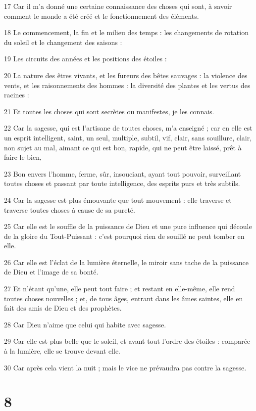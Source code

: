 \par 17 Car il m'a donné une certaine connaissance des choses qui sont, à savoir comment le monde a été créé et le fonctionnement des éléments.
\par 18 Le commencement, la fin et le milieu des temps : les changements de rotation du soleil et le changement des saisons :
\par 19 Les circuits des années et les positions des étoiles :
\par 20 La nature des êtres vivants, et les fureurs des bêtes sauvages : la violence des vents, et les raisonnements des hommes : la diversité des plantes et les vertus des racines :
\par 21 Et toutes les choses qui sont secrètes ou manifestes, je les connais.
\par 22 Car la sagesse, qui est l'artisane de toutes choses, m'a enseigné ; car en elle est un esprit intelligent, saint, un seul, multiple, subtil, vif, clair, sans souillure, clair, non sujet au mal, aimant ce qui est bon, rapide, qui ne peut être laissé, prêt à faire le bien,
\par 23 Bon envers l'homme, ferme, sûr, insouciant, ayant tout pouvoir, surveillant toutes choses et passant par toute intelligence, des esprits purs et très subtils.
\par 24 Car la sagesse est plus émouvante que tout mouvement : elle traverse et traverse toutes choses à cause de sa pureté.
\par 25 Car elle est le souffle de la puissance de Dieu et une pure influence qui découle de la gloire du Tout-Puissant : c'est pourquoi rien de souillé ne peut tomber en elle.
\par 26 Car elle est l'éclat de la lumière éternelle, le miroir sans tache de la puissance de Dieu et l'image de sa bonté.
\par 27 Et n'étant qu'une, elle peut tout faire ; et restant en elle-même, elle rend toutes choses nouvelles ; et, de tous âges, entrant dans les âmes saintes, elle en fait des amis de Dieu et des prophètes.
\par 28 Car Dieu n'aime que celui qui habite avec sagesse.
\par 29 Car elle est plus belle que le soleil, et avant tout l'ordre des étoiles : comparée à la lumière, elle se trouve devant elle.
\par 30 Car après cela vient la nuit ; mais le vice ne prévaudra pas contre la sagesse.

\chapter{8}

